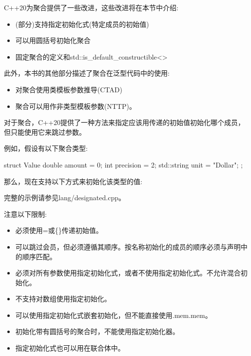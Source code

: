 
C++20为聚合提供了一些改进，这些改进将在本节中介绍:

\begin{itemize}
\item 
(部分)支持指定初始化式(特定成员的初始值)

\item 
可以用圆括号初始化聚合

\item 
固定聚合的定义和std::is\_default\_constructible<>
\end{itemize}

此外，本书的其他部分描述了聚合在泛型代码中的使用:

\begin{itemize}
\item 
对聚合使用类模板参数推导(CTAD)

\item 
聚合可以用作非类型模板参数(NTTP)。
\end{itemize}


对于聚合，C++20提供了一种方法来指定应该用传递的初始值初始化哪个成员，但只能使用它来跳过参数。

例如，假设有以下聚合类型:

\begin{cpp}
struct Value {
	double amount = 0;
	int precision = 2;
	std::string unit = "Dollar";
};
\end{cpp}

那么，现在支持以下方式来初始化该类型的值:


完整的示例请参见lang/designated.cpp。

注意以下限制:

\begin{itemize}
\item 
必须使用=或\{\}传递初始值。

\item 
可以跳过会员，但必须遵循其顺序。按名称初始化的成员的顺序必须与声明中的顺序匹配。

\item 
必须对所有参数使用指定初始化式，或者不使用指定初始化式。不允许混合初始化。

\item 
不支持对数组使用指定初始化。

\item 
可以使用指定初始化式嵌套初始化，但不能直接使用.mem.mem。

\item 
初始化带有圆括号的聚合时，不能使用指定初始化器。

\item 
指定初始化式也可以用在联合体中。
\end{itemize}

